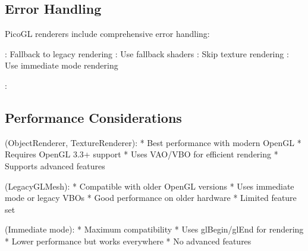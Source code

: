 \documentclass[a4paper,10pt,english,openany,oneside]{sphinxmanual}
\begin{document}
\subsection{Error Handling}
\label{\detokenize{api/renderer:error-handling}}
\sphinxAtStartPar
PicoGL renderers include comprehensive error handling:

\sphinxAtStartPar
{}: Fallback to legacy rendering
: Use fallback shaders
: Skip texture rendering
: Use immediate mode rendering

\sphinxAtStartPar
{}:

\begin{sphinxVerbatim}[commandchars=\\\{\}]
   
   
\end{sphinxVerbatim}


\subsection{Performance Considerations}
\label{\detokenize{api/renderer:performance-considerations}}
\sphinxAtStartPar
{} (ObjectRenderer, TextureRenderer):
* Best performance with modern OpenGL
* Requires OpenGL 3.3+ support
* Uses VAO/VBO for efficient rendering
* Supports advanced features

\sphinxAtStartPar
{} (LegacyGLMesh):
* Compatible with older OpenGL versions
* Uses immediate mode or legacy VBOs
* Good performance on older hardware
* Limited feature set

\sphinxAtStartPar
{} (Immediate mode):
* Maximum compatibility
* Uses glBegin/glEnd for rendering
* Lower performance but works everywhere
* No advanced features
\end{document}
